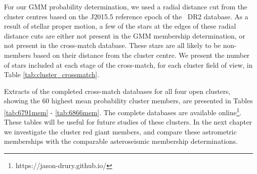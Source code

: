 \label{sect:cuts}

For our GMM probability determination, we used a radial distance cut from the cluster centres based on the J2015.5 reference epoch of the \Gaia~DR2 database. As a result of stellar proper motion, a few of the stars at the edges of these radial distance cuts are either not present in the GMM membership determination, or not present in the cross-match database. These stars are all likely to be non-members based on their distance from the cluster centre. We present the number of stars included at each stage of the cross-match, for each cluster field of view, in Table \ref{tab:cluster_crossmatch}. 

Extracts of the completed cross-match databases for all four open clusters, showing the 60 highest mean probability cluster members, are presented in Tables \ref{tab:6791mem} - \ref{tab:6866mem}. The complete databases are available online\footnote[2]{https://jason-drury.github.io/}. These tables will be useful for future studies of these clusters. In the next chapter we investigate the cluster red giant members, and compare these astrometric memberships with the comparable asteroseismic membership determinations.

